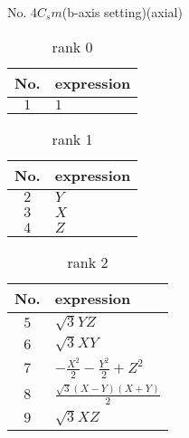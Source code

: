 \documentclass[fleqn,8pt,landscape]{jsarticle}
\begin{document}
\setcounter{MaxMatrixCols}{16}

\begin{center}
\LARGE
No. 4\quad$C_{s}$\quad$m$\quad(b-axis setting)\quad[ monoclinic ] (axial)
\end{center}
\begin{table}[ht!]
\begin{center}
\caption{rank 0}
\renewcommand{\arraystretch}{1.3}
\begin{tabular}{cl} \hline \hline
No. & expression \\ \hline
$ 1 $ & $ 1 $ \\
 \hline \hline
\end{tabular}
\end{center}
\end{table}
\begin{table}[ht!]
\begin{center}
\caption{rank 1}
\renewcommand{\arraystretch}{1.3}
\begin{tabular}{cl} \hline \hline
No. & expression \\ \hline
$ 2 $ & $ Y $ \\
$ 3 $ & $ X $ \\
$ 4 $ & $ Z $ \\
 \hline \hline
\end{tabular}
\end{center}
\end{table}
\begin{table}[ht!]
\begin{center}
\caption{rank 2}
\renewcommand{\arraystretch}{1.3}
\begin{tabular}{cl} \hline \hline
No. & expression \\ \hline
$ 5 $ & $ \sqrt{3} Y Z $ \\
$ 6 $ & $ \sqrt{3} X Y $ \\
$ 7 $ & $ - \frac{X^{2}}{2} - \frac{Y^{2}}{2} + Z^{2} $ \\
$ 8 $ & $ \frac{\sqrt{3} \left(X - Y\right) \left(X + Y\right)}{2} $ \\
$ 9 $ & $ \sqrt{3} X Z $ \\
 \hline \hline
\end{tabular}
\end{center}
\end{table}
\end{document}
